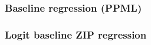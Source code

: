 \documentclass{beamer}
\begin{document}
\begin{frame}[plain]\frametitle{Baseline regression (PPML)}
\begin{figure}[h!]
\begin{center}
\setlength{\fboxrule}{1pt} %
\setlength{\fboxsep}{.1in} %
\end{center}
\end{figure}
\end{frame}

\begin{frame}[plain]\frametitle{Logit baseline ZIP regression}
\begin{figure}[h!]
\begin{center}
\setlength{\fboxrule}{1pt} %
\setlength{\fboxsep}{.1in} %
\end{center}
\end{figure}
\end{frame}
\fi
\end{document}
